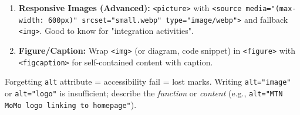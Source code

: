 \documentclass[11pt]{article}
\begin{document}
\begin{methode}
\begin{enumerate}
    \item \textbf{Responsive Images (Advanced):} \texttt{<picture>} with \texttt{<source media="(max-width: 600px)" srcset="small.webp" type="image/webp">} and fallback \texttt{<img>}. Good to know for "integration activities".
    \item \textbf{Figure/Caption:} Wrap \texttt{<img>} (or diagram, code snippet) in \texttt{<figure>} with \texttt{<figcaption>} for self-contained content with caption.
\end{enumerate}
\begin{aretenir}
Forgetting \texttt{alt} attribute = accessibility fail = lost marks. Writing \texttt{alt="image"} or \texttt{alt="logo"} is insufficient; describe the \emph{function} or \emph{content} (e.g., \texttt{alt="MTN MoMo logo linking to homepage"}).
\end{aretenir}
\end{methode}
\end{document}
